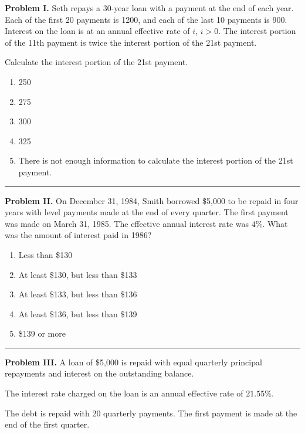 \documentclass[11pt]{article}
\begin{document}


\textbf{Problem I.} Seth repays a 30-year loan with a payment at the end of each year. Each of the first 20 payments is 1200, and each of the last 10 payments is 900. Interest on the loan is at an annual effective rate of \(i\), \(i>0\). The interest portion of the 11th payment is twice the interest portion of the 21st payment.

Calculate the interest portion of the 21st payment.

\begin{enumerate}[label=\Alph*.]
    \item 250
    \item 275
    \item 300
    \item 325
    \item There is not enough information to calculate the interest portion of the 21st payment.
\end{enumerate}

\medskip
\hrule

\medskip

\textbf{Problem II.} On December 31, 1984, Smith borrowed \$5{,}000 to be repaid in four years with level payments made at the end of every quarter. The first payment was made on March 31, 1985. The effective annual interest rate was \(4\%\). What was the amount of interest paid in 1986?

\begin{enumerate}[label=\Alph*., leftmargin=2.2em]
    \item Less than \$130
    \item At least \$130, but less than \$133
    \item At least \$133, but less than \$136
    \item At least \$136, but less than \$139
    \item \$139 or more
\end{enumerate}

\medskip
\hrule

\medskip

\textbf{Problem III.} A loan of \$5{,}000 is repaid with equal quarterly principal repayments and interest on the outstanding balance.

The interest rate charged on the loan is an annual effective rate of \(21.55\%\).

The debt is repaid with 20 quarterly payments. The first payment is made at the end of the first quarter.
\end{document}
